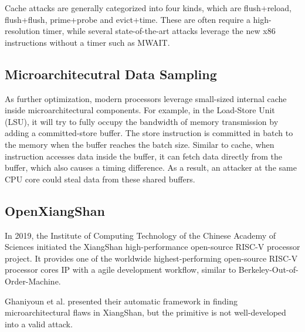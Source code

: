 Cache attacks are generally categorized into four kinds, which are flush+reload, flush+flush, prime+probe and evict+time. These are often require a high-resolution timer, while several state-of-the-art attacks leverage the new x86 instructions without a timer such as MWAIT\cite{mwait}.

\subsection{Microarchitecutral Data Sampling}
As further optimization, modern processors leverage small-sized internal cache inside microarchitectural components. For example, in the Load-Store Unit (LSU), it will try to fully occupy the bandwidth of memory transmission by adding a committed-store buffer. The store instruction is committed in batch to the memory when the buffer reaches the batch size. Similar to cache, when instruction accesses data inside the buffer, it can fetch data directly from the buffer, which also causes a timing difference. As a result, an attacker at the same CPU core could steal data from these shared buffers.

\subsection{OpenXiangShan}
In 2019, the Institute of Computing Technology of the Chinese Academy of Sciences initiated the XiangShan high-performance open-source RISC-V processor project. It provides one of the worldwide highest-performing open-source RISC-V processor cores IP with a agile development workflow, similar to Berkeley-Out-of-Order-Machine.

Ghaniyoun et al.\cite{teesec} presented their automatic framework in finding microarchitectural flaws in XiangShan, but the primitive is not well-developed into a valid attack.